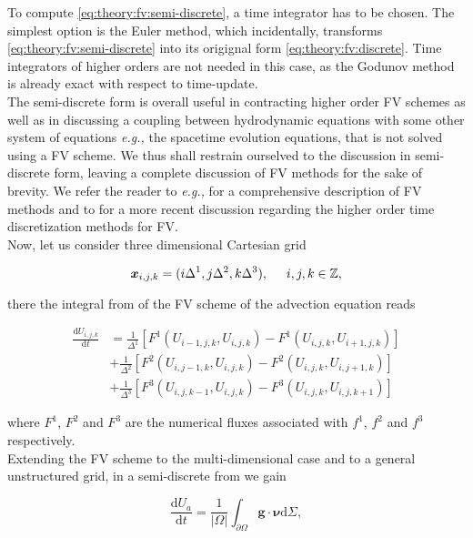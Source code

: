 \documentclass[11pt,a4paper,headinclude=true,DIV=14,BCOR=8mm,chapterprefix,listof=totoc,twoside,openright,abstracton]{scrbook}
\begin{document}
To compute \ref{eq:theory:fv:semi-discrete}, a time integrator has to be chosen. The simplest option is the Euler method, which incidentally, transforms \ref{eq:theory:fv:semi-discrete} into its origignal form \ref{eq:theory:fv:discrete}. Time integrators of higher orders are not needed in this case, as the Godunov method is already exact with respect to time-update. \\

The semi-discrete form is overall useful in contracting higher order FV schemes as well as in discussing a coupling between hydrodynamic equations with some other system of equations \textit{e.g.,} the spacetime evolution equations, that is not solved using a FV scheme. We thus shall restrain ourselved to the discussion in semi-discrete form, leaving a complete discussion of FV methods for the sake of brevity. We refer the reader to \textit{e.g.,} \cite{Toro:1999} for a comprehensive description of FV methods and to \cite{Gassner:2011} for a more recent discussion regarding the higher order time discretization methods for FV. \\ 

Now, let us consider three dimensional Cartesian grid 

\begin{equation}
    \boldsymbol{x}_{i,j,k} = (i\Delta^1,j\Delta^2,k\Delta^3), \hspace{5mm} i, j, k \in \mathbb{Z},
\end{equation}

there the integral from of the FV scheme of the advection equation reads

\begin{align}
    \frac{\text{d}U_{i,j,k}}{\text{d}t} &= \frac{1}{\Delta^1}[F^1(U_{i-1,j,k}, U_{i,j,k}) - F^1(U_{i,j,k}, U_{i+1,j,k})] \\
    &+ \frac{1}{\Delta^2}[F^2(U_{i,j-1,k}, U_{i,j,k}) - F^2(U_{i,j,k}, U_{i,j+1,k})] \\
    &+ \frac{1}{\Delta^3}[F^3(U_{i,j,k-1}, U_{i,j,k}) - F^3(U_{i,j,k}, U_{i,j,k+1})]
    \label{eq:theory:fv:1storder3dscheme}
\end{align}

where $F^1$, $F^2$ and $F^3$ are the numerical fluxes associated with $f^1$, $f^2$ and $f^3$ respectively. \\


Extending the FV scheme to the multi-dimensional case and to a general unstructured grid, in a semi-discrete from we gain

\begin{equation}
    \frac{\text{d}U_a}{\text{d}t} = \frac{1}{|\Omega|}\int_{\partial\Omega}\boldsymbol{g}\cdot\boldsymbol{\nu}\text{d}\Sigma,
\end{equation}
\end{document}
